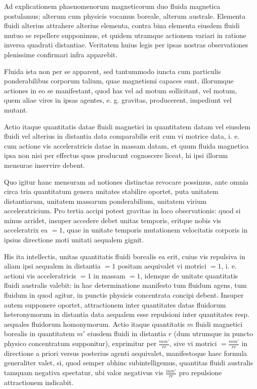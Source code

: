Ad explicationem phaenomenorum magneticorum duo fluida magnetica postulamus; alterum cum physicis vocamus boreale, alterum australe. Elementa fluidi alterius attrahere alterius elementa, contra bina elementa eiusdem fluidi mutuo se repellere supponimus, et quidem utramque actionem variari in ratione inversa quadrati distantiae. Veritatem huius legis per ipsas nostras observationes plenissime confirmari infra apparebit.

Fluida ista non per se apparent, sed tantummodo iuncta cum particulis ponderabilibus corporum talium, quae magnetismi capaces sunt, illorumque actiones in eo se manifestant, quod has vel ad motum sollicitant, vel motum, quem aliae vires in ipsas agentes, e. g. gravitas, producerent, impediunt vel mutant.

Actio itaque quantitatis datae fluidi magnetici in quantitatem datam vel eiusdem fluidi vel alterius in distantia data comparabilis erit cum vi motrice data, i. e. cum actione vis acceleratricis datae in massam datam, et quum fluida magnetica ipsa non nisi per effectus quos producunt cognoscere liceat, hi ipsi illorum mensurae inservire debent.

Quo igitur hanc mensuram ad notiones distinctas revocare possimus, ante omnia circa tria quantitatum genera unitates stabilire oportet, puta unitatem distantiarum, unitatem massarum ponderabilium, unitatem virium acceleratricium. Pro tertia accipi potest gravitas in loco observationis: quod si minus arridet, insuper accedere debet unitas temporis, eritque nobis vis acceleratrix ea $=1$, quae in unitate temporis mutationem velocitatis corporis in ipsius directione moti unitati aequalem gignit.

His ita intellectis, unitas quantitatis fluidi borealis ea erit, cuius vis repulsiva in aliam ipsi aequalem in distantia $=1$ positam aequivalet vi motrici $=1$, i. e. actioni vis acceleratricis $=1$ in massam $=1$, idemque de unitate quantitatis fluidi australis valebit: in hac determinatione manifesto tum fluidum agens, tum fluidum in quod agitur, in punctis physicis concentrata concipi debent. Insuper autem supponere oportet, attractionem inter quantitates datas fluidorum heteronymorum in distantia data aequalem esse repulsioni inter quantitates resp. aequales fluidorum homonymorum. Actio itaque quantitatis $m$ fluidi magnetici borealis in quantitatem $m'$ eiusdem fluidi in distantia $r$ (dum utrumque in puncto physico concentratum supponitur), exprimitur per $\frac{mm'}{rr}$, sive vi motrici $=\frac{mm'}{rr}$ in directione a priori versus posterius agenti aequivalet, manifestoque haec formula generaliter valet, si, quod semper abhinc subintelligemus, quantitas fluidi australis tamquam negativa spectatur, ubi valor negativus vis $\frac{mm'}{rr}$ pro repulsione attractionem indicabit.

